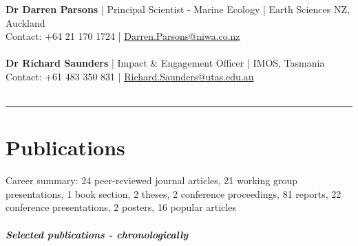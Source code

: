 \documentclass[10pt,a4paper]{article}
\begin{document}
\textbf{Dr Darren Parsons} | Principal Scientist - Marine Ecology | Earth Sciences NZ, Auckland\\
Contact: +64 21 170 1724 | \href{mailto: Darren.Parsons@niwa.co.nz}{Darren.Parsons@niwa.co.nz}\\
\\
\textbf{Dr Richard Saunders} | Impact \& Engagement Officer | IMOS, Tasmania\\
Contact: +61 483 350 831 | \href{mailto:Richard.Saunders@utas.edu.au}{Richard.Saunders@utas.edu.au}\\
\\

\hrule
\newpage
\vspace{6pt}
\noindent
\section*{Publications}

Career summary: 24 peer-reviewed journal articles, 21 working group presentations, 1 book section, 2 theses, 2 conference proceedings, 81 reports, 22 conference presentations, 2 posters, 16 popular articles\\ 
\\
\textit{\textbf{Selected publications - chronologically}}\\
\end{document}
